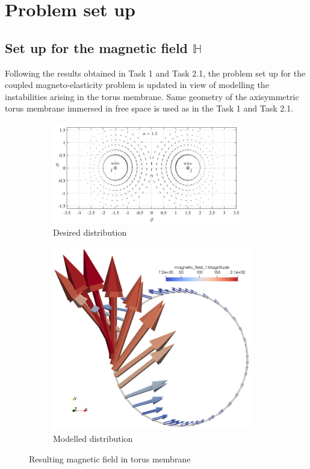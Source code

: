 \documentclass[11pt,a4paper,final]{article}
\begin{document}
\section{Problem set up}

\subsection{Set up for the magnetic field $\mathbb{H}$}
Following the results obtained in Task 1 and Task 2.1, the problem set up for the coupled magneto-elasticity problem is updated in view of modelling the instabilities arising in the torus membrane. Same geometry of the axisymmetric torus membrane immersed in free space is used as in the Task 1 and Task 2.1.  \par 

\begin{figure}[h]
\centering
\begin{subfigure}{0.59\textwidth}
\centering
\includegraphics[width=0.9\textwidth]{magnetic_field_saxena.png}
\caption{Desired distribution \cite{Reddy2017}}
\label{fig:3.3.1}
\end{subfigure}
\begin{subfigure}{0.39\textwidth}
\centering
\includegraphics[width=0.95\textwidth]{2d_toroid_field_2.png}
\caption{Modelled distribution}
\label{fig:3.3.2}
\end{subfigure}
\caption{Resulting magnetic field in torus membrane}
\label{fig:3.3}
\end{figure}
\end{document}
